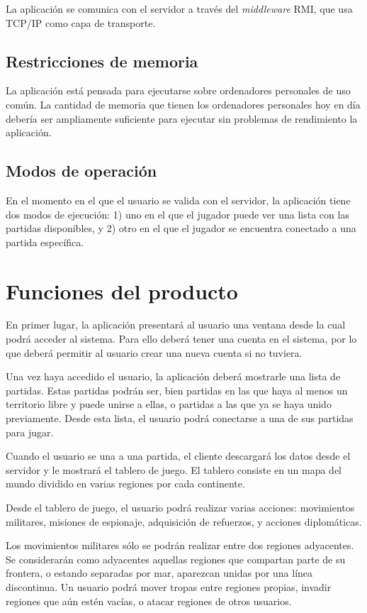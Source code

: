 La aplicación se comunica con el servidor a través del \textit{middleware} RMI,
que usa TCP/IP como capa de transporte.

\subsection{Restricciones de memoria}

La aplicación está pensada para ejecutarse sobre ordenadores personales de uso
común. La cantidad de memoria que tienen los ordenadores personales hoy en día
debería ser ampliamente suficiente para ejecutar sin problemas de rendimiento
la aplicación.

\subsection{Modos de operación}

En el momento en el que el usuario se valida con el servidor, la aplicación
tiene dos modos de ejecución: 1) uno en el que el jugador puede ver una lista
con las partidas disponibles, y 2) otro en el que el jugador se encuentra
conectado a una partida específica.

\section{Funciones del producto}

En primer lugar, la aplicación presentará al usuario una ventana desde la cual
podrá acceder al sistema. Para ello deberá tener una cuenta en el sistema, por
lo que deberá permitir al usuario crear una nueva cuenta si no tuviera.

Una vez haya accedido el usuario, la aplicación deberá mostrarle una lista de
partidas. Estas partidas podrán ser, bien partidas en las que haya al menos un
territorio libre y puede unirse a ellas, o partidas a las que ya se haya unido
previamente. Desde esta lista, el usuario podrá conectarse a una de sus partidas
para jugar.

Cuando el usuario se una a una partida, el cliente descargará los datos desde
el servidor y le mostrará el tablero de juego. El tablero consiste en un mapa
del mundo dividido en varias regiones por cada continente.

Desde el tablero de juego, el usuario podrá realizar varias acciones:
movimientos militares, misiones de espionaje, adquisición de refuerzos, y
acciones diplomáticas.

Los movimientos militares sólo se podrán realizar entre dos regiones
adyacentes. Se considerarán como adyacentes aquellas regiones que compartan
parte de su frontera, o estando separadas por mar, aparezcan unidas por una
línea discontinua. Un usuario podrá mover tropas entre regiones propias,
invadir regiones que aún estén vacías, o atacar regiones de otros usuarios.

